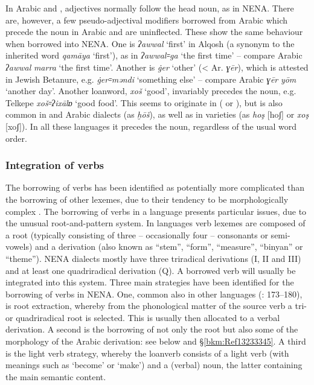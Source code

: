 \documentclass[output=paper]{langsci/langscibook}
\begin{document}
In Arabic and , adjectives normally follow the head noun, as in NENA. There are, however, a few pseudo-adjectival modifiers borrowed from Arabic which precede the noun in Arabic and are uninflected. These show the same behaviour when borrowed into NENA. One is \textit{ʔawwal} ‘first’ in  Alqosh (a synonym to the inherited word \textit{qamāya} ‘first’), as in \textit{ʔawwal꞊ga} ‘the first time’ – compare Arabic \textit{ʔawwal} \textit{marra} ‘the first time’. Another is \textit{\.ger} ‘other’ (<  Ar. \textit{ɣēr}), which is attested in Jewish Betanure, e.g. \textit{\.ger꞊məndi} ‘something else’ \citep[105]{Mutzafi2008} – compare  Arabic \textit{ɣēr} \textit{yōm} ‘another day’. Another {loanword}, \textit{xoš} ‘good’, invariably precedes the noun, e.g.  Telkepe \textit{xoš꞊ʔixālɒ} ‘good food’. This seems to originate in  ( or ), but is also common in  and  Arabic dialects (as \textit{ḫōš}), as well as in  varieties (as \textit{hoş} [hoʃ] or \textit{xoş} [xoʃ]). In all these languages it precedes the noun, regardless of the usual {word order}.

\subsubsection{\label{bkm:Ref13233110}Integration of verbs}

The borrowing of verbs has been identified as potentially more complicated than the borrowing of other lexemes, due to their tendency to be morphologically complex \citep[175]{Matras2009}. The borrowing of verbs in a  language presents particular issues, due to the unusual {root-and-pattern} system. In  languages verb lexemes are composed of a {root} (typically consisting of three – occasionally four – consonants or semi-vowels) and a {derivation} (also known as ``{stem}'', ``form'', ``measure'', ``binyan'' or ``theme''). NENA dialects mostly have three triradical derivations (I, II and III) and at least one quadriradical {derivation} (Q). A borrowed verb will usually be integrated into this system. Three main strategies have been identified for the borrowing of verbs in NENA. One, common also in other  languages (\citealt{Wohlgemuth2009}: 173–180), is {root} extraction, whereby from the phonological matter of the source verb a tri- or quadriradical {root} is selected. This is usually then allocated to a verbal {derivation}. A second is the borrowing of not only the {root} but also some of the morphology of the Arabic {derivation}: see below and §\ref{bkm:Ref13233345}. A third is the {light verb} strategy, whereby the loanverb consists of a {light verb} (with meanings such as `become' or `make') and a (verbal) noun, the latter containing the main semantic content. 
\end{document}
